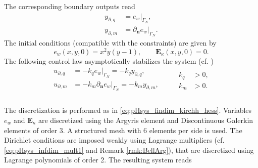 The corresponding boundary outputs read
\begin{equation*}
\begin{aligned}
y_{\partial, q} &= e_w|_{\Gamma_N}, \\
y_{\partial, m} &=\partial_{\bm{n}} e_w|_{\Gamma_N}.
\end{aligned}
\end{equation*}
The initial conditions (compatible with the constraints) are given by
\[
e_w(x,y,0) = x^2 y (y-1), \qquad \bm{E}_\kappa(x,y,0) ={0}.
\]
The following control law asymptotically stabilizes the system (cf. \cite{lagnese1989})
\begin{equation}\label{eq:ctrllaw_Kir}
\begin{aligned}
u_{\partial, q} &= - k_q e_w|_{\Gamma_N} = - k_q y_{\partial, q}, \\
u_{\partial, m} &= - k_m \partial_{\bm{n}} e_w|_{\Gamma_N}  = - k_m y_{\partial, m}, \\
\end{aligned} \qquad
\begin{aligned}
 k_q&>0, \\
 k_m&>0.
\end{aligned}
\end{equation}
\\

The discretization is performed as in \eqref{eq:pHsys_findim_kirchh_hess}. Variables $e_w$ and $\bm{E}_\kappa$ are discretized using the Argyris element and Discontinuous Galerkin elements of order 3. A structured mesh with 6 elements per side is used. The Dirichlet conditions are imposed weakly using Lagrange multipliers (cf. \eqref{eq:pHsys_infdim_mult1} and Remark \ref{rmk:BellArg}), that are discretized using Lagrange polynomials of order 2. The resulting system reads

